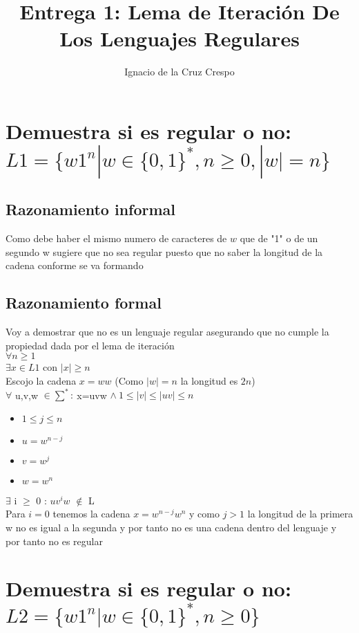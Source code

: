 \documentclass[11pt]{article}
\begin{document}
\title{Entrega 1: Lema de Iteración De Los Lenguajes Regulares}
\author{Ignacio de la Cruz Crespo}
\maketitle


\section{Demuestra si es regular o no:\\ $L1=\{w1^n|w\in\{0,1\}^*,n\geqslant0,|w|=n\}$}
\subsection{Razonamiento informal}
Como debe haber el mismo numero de caracteres de $w$ que de "1" o de un segundo w sugiere que no sea regular puesto que no saber la longitud de la cadena conforme se va formando
\subsection{Razonamiento formal}
Voy a demostrar que no es un lenguaje regular asegurando que no cumple la propiedad dada por el lema de iteración\\
$\forall n \geq 1$\\
$\exists x \in L1$ con $|x| \geq n$\\
Escojo la cadena $x = ww$ (Como $|w|=n$ la longitud es $2n$)\\
$\forall$ u,v,w $\in \sum^*:\ $x=uvw $\wedge\ 1 \leq |v| \leq |uv| \leq n$\\
\begin{itemize}
\item$1 \leq j \leq n $
\item$u = w^{n-j}$
\item$v = w^j$
\item$w = w^n$
\end{itemize}
$\exists$ i $\geq$ 0 : $uv^iw$ $\notin$ L\\
Para $i = 0$ tenemos la cadena $x = w^{n-j}w^n$ y como $j > 1$ la longitud de la primera w no es igual a la segunda y por tanto no es una cadena dentro del lenguaje y por tanto no es regular
\section{Demuestra si es regular o no:\\ $L2=\{w1^n|w\in\{0,1\}^*,n\geqslant0\}$}
\end{document}

